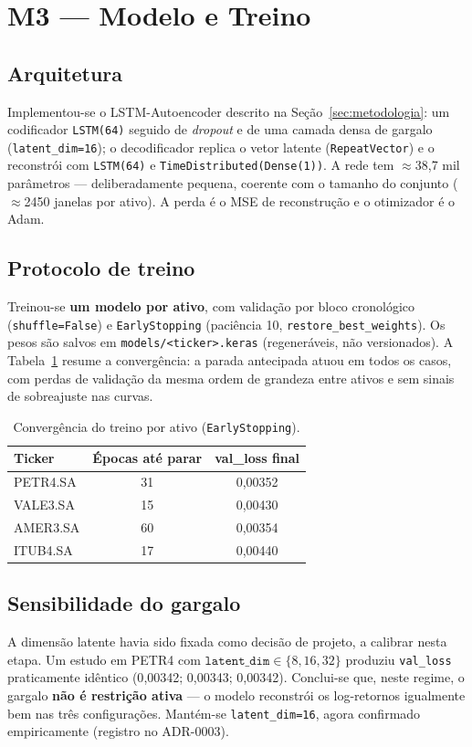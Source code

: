 \section{M3 --- Modelo e Treino}
\label{sec:m3}

\subsection{Arquitetura}
Implementou-se o LSTM-Autoencoder descrito na Seção~\ref{sec:metodologia}: um codificador
\texttt{LSTM(64)} seguido de \emph{dropout} e de uma camada densa de gargalo
(\texttt{latent\_dim=16}); o decodificador replica o vetor latente (\texttt{RepeatVector})
e o reconstrói com \texttt{LSTM(64)} e \texttt{TimeDistributed(Dense(1))}. A rede tem
$\approx$38{,}7 mil parâmetros --- deliberadamente pequena, coerente com o tamanho do
conjunto ($\approx$2450 janelas por ativo). A perda é o MSE de reconstrução e o otimizador
é o Adam.

\subsection{Protocolo de treino}
Treinou-se \textbf{um modelo por ativo}, com validação por bloco cronológico
(\texttt{shuffle=False}) e \texttt{EarlyStopping} (paciência 10, \texttt{restore\_best\_weights}).
Os pesos são salvos em \texttt{models/<ticker>.keras} (regeneráveis, não versionados). A
Tabela~\ref{tab:treino} resume a convergência: a parada antecipada atuou em todos os casos,
com perdas de validação da mesma ordem de grandeza entre ativos e sem sinais de
sobreajuste nas curvas.

\begin{table}[h]
\centering
\caption{Convergência do treino por ativo (\texttt{EarlyStopping}).}
\label{tab:treino}
\begin{tabular}{lcc}
\toprule
\textbf{Ticker} & \textbf{Épocas até parar} & \textbf{val\_loss final} \\
\midrule
PETR4.SA & 31 & 0{,}00352 \\
VALE3.SA & 15 & 0{,}00430 \\
AMER3.SA & 60 & 0{,}00354 \\
ITUB4.SA & 17 & 0{,}00440 \\
\bottomrule
\end{tabular}
\end{table}

\subsection{Sensibilidade do gargalo}
A dimensão latente havia sido fixada como decisão de projeto, a calibrar nesta etapa. Um
estudo em PETR4 com $\texttt{latent\_dim} \in \{8, 16, 32\}$ produziu \texttt{val\_loss}
praticamente idêntico (0{,}00342; 0{,}00343; 0{,}00342). Conclui-se que, neste regime, o
gargalo \textbf{não é restrição ativa} --- o modelo reconstrói os log-retornos igualmente
bem nas três configurações. Mantém-se \texttt{latent\_dim=16}, agora confirmado
empiricamente (registro no ADR-0003).

